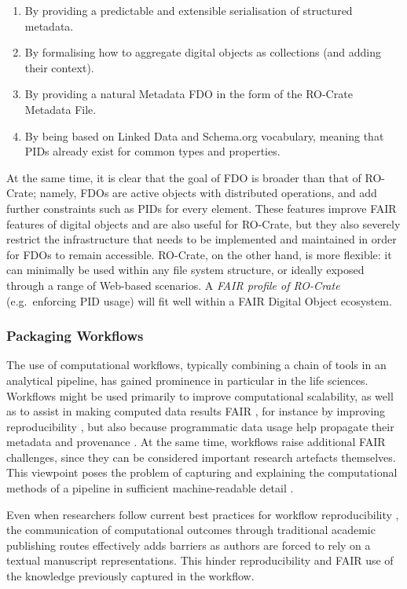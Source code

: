\begin{enumerate}
\item
  By providing a predictable and extensible serialisation of structured
  metadata.
\item
  By formalising how to aggregate digital objects as collections (and
  adding their context).
\item
  By providing a natural Metadata FDO in the form of the RO-Crate
  Metadata File.
\item
  By being based on Linked Data and Schema.org vocabulary, meaning that
  PIDs already exist for common types and properties.
\end{enumerate}

At the same time, it is clear that the goal of FDO is broader than that
of RO-Crate; namely, FDOs are active objects with distributed
operations, and add further constraints such as PIDs for every element.
These features improve FAIR features of digital objects and are also
useful for RO-Crate, but they also severely restrict the infrastructure
that needs to be implemented and maintained in order for FDOs to remain
accessible. RO-Crate, on the other hand, is more flexible: it can
minimally be used within any file system structure, or ideally exposed
through a range of Web-based scenarios. A \emph{FAIR profile of
RO-Crate} (e.g.~enforcing PID usage) will fit well within a FAIR Digital
Object ecosystem.

\subsubsection{Packaging Workflows}\label{ch5:packaging-workflows}

The use of computational workflows, typically combining a chain of tools
in an analytical pipeline, has gained prominence in particular in the
life sciences. Workflows might be used primarily to improve
computational scalability, as well as to assist in making computed data
results FAIR \cite{ch5-55}, for
instance by improving reproducibility
\cite{Cohen-Boulakia 2017}, but also
because programmatic data usage help propagate their metadata and
provenance \cite{ch5-69}. At the
same time, workflows raise additional FAIR challenges, since they can be
considered important research artefacts themselves. This viewpoint poses
the problem of capturing and explaining the computational methods of a
pipeline in sufficient machine-readable detail
\cite{ch5-80}.

Even when researchers follow current best practices for workflow
reproducibility
\cite{ch5-60}
\cite{Cohen-Boulakia 2017}, the
communication of computational outcomes through traditional academic
publishing routes effectively adds barriers as authors are forced to
rely on a textual manuscript representations. This hinder
reproducibility and FAIR use of the knowledge previously captured in the
workflow.

